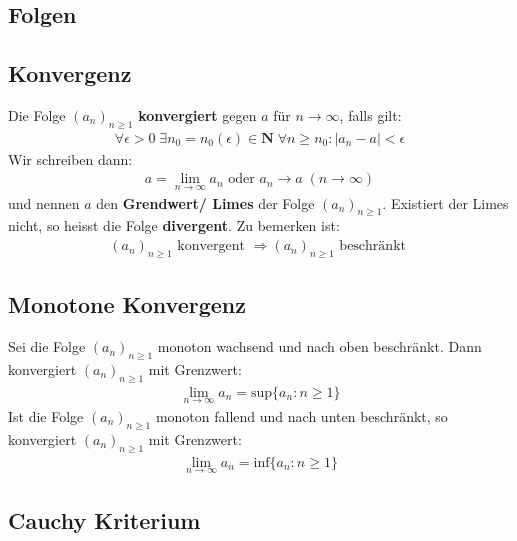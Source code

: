 \documentclass[8pt]{extarticle}
\begin{document}
\setlength{\columnseprule}{0.4pt}
\begin{multicols*}{3}

\section{Folgen}
\hypertarget{sec:0}{}


  \subsection {Konvergenz}

Die Folge $(a_n)_{n \geq 1}$ \textbf{konvergiert} gegen $a$ für
$n \rightarrow \infty$, falls gilt:
\begin{align*}
  \forall \epsilon > 0 \; \exists n_0 = n_0(\epsilon) \in \mathbf{N} \; \forall n \geq n_0 : |a_n - a| < \epsilon
\end{align*}
Wir schreiben dann:
\begin{align*}
  a = \lim_{n \rightarrow \infty} a_n \text{ oder }a_n \rightarrow a \; (n \rightarrow \infty)
\end{align*}
und nennen $a$ den \textbf{Grendwert/ Limes} der Folge $(a_n)_{n \geq 1}$.
Existiert der Limes nicht, so heisst die Folge \textbf{divergent}. Zu bemerken ist:
\begin{align*}
  (a_n)_{n \geq 1} \text{ konvergent } \Rightarrow (a_n)_{n \geq 1} \text{ beschränkt }
\end{align*}
  \subsection{Monotone Konvergenz}
Sei die Folge $(a_n)_{n \geq 1}$ monoton wachsend und nach oben beschränkt.
Dann konvergiert $(a_n)_{n \geq 1}$ mit Grenzwert:
\begin{align*}
  \lim_{n \rightarrow \infty} a_n = \text{sup} \{a_n : n \geq 1\}
\end{align*}
Ist die Folge $(a_n)_{n \geq 1}$ monoton fallend und nach unten beschränkt,
so konvergiert $(a_n)_{n \geq 1}$ mit Grenzwert:
\begin{align*}
  \lim_{n \rightarrow \infty} a_n = \text{inf} \{a_n : n \geq 1\}
\end{align*}
\subsection{Cauchy Kriterium}


\end{multicols*}
\end{document}
